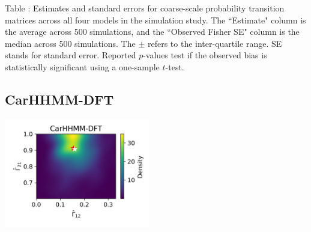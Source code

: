 \documentclass{article}
\begin{document}
        \noindent Table : Estimates and standard errors for coarse-scale probability transition matrices across all four models in the simulation study. The ``Estimate" column is the average across 500 simulations, and the ``Observed Fisher SE" column is the median across 500 simulations. The $\pm$ refers to the inter-quartile range. SE stands for standard error. Reported $p$-values test if the observed bias is statistically significant using a one-sample $t$-test.
        \addtocounter{tablenum}{1}
        
        \newpage
        \subsection{CarHHMM-DFT}
        \begin{center}
        \includegraphics[width=2.5in]{../Plots/hhmm_FV_Gamma_density_-1_row_-1.png}
        

\end{center}
\end{document}
